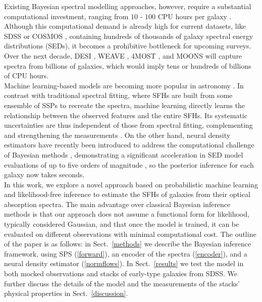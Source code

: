 Existing Bayesian spectral modelling approaches, however, require a substantial computational investment, ranging from $10$ - $100$ CPU hours per galaxy \citep{Carnall_2019,tacchela21}. Although this computational demand is already high for current datasets, like SDSS \citep{SDSS} or COSMOS \citep{cosmos}, containing hundreds of thousands of galaxy spectral energy distributions (SEDs), it becomes a prohibitive bottleneck for upcoming surveys. Over the next decade, DESI \citep{desi}, WEAVE \citep{weave}, 4MOST \citep{4most}, and MOONS \citep{MOONS} will capture spectra from billions of galaxies, which would imply tens or hundreds of billions of CPU hours.\\

Machine learning-based models are becoming more popular in astronomy \citep[e.g.][]{huertascompany2023brief, joanna24,moser24,hunt2024predicting}. In contrast with traditional spectral fitting, where SFHs are built from some ensemble of SSPs to recreate the spectra, machine learning directly learns the relationship between the observed features and the entire SFHs. Its systematic uncertainties are thus independent of those from spectral fitting, complementing and strengthening the measurements \citep{lovell19}. On the other hand, neural density estimators have recently been introduced to address the computational challenge of Bayesian methods \citep[e.g.][]{kwon24}, demonstrating a significant acceleration in SED model evaluations of up to five orders of magnitude \citep{Hahn_2022}, so the posterior inference for each galaxy now takes seconds.\\


In this work, we explore a novel approach based on probabilistic machine learning and likelihood-free inference to estimate the SFHs of galaxies from their optical absorption spectra.  The main advantage over classical Bayesian inference methods is that our approach does not assume a functional form for likelihood, typically considered Gaussian, and that once the model is trained, it can be evaluated on different observations with minimal computational cost. The outline of the paper is as follows: in Sect.~\ref{methods} we describe the Bayesian inference framework, using SPS (\ref{forward}), an encoder of the spectra (\ref{encoder}),  and a neural density estimator (\ref{normflows}). In Sect.~\ref{results} we test the model in both mocked observations and stacks of early-type galaxies from SDSS. We further discuss the details of the model and the measurements of the stacks' physical properties in Sect.~\ref{discussion}.
